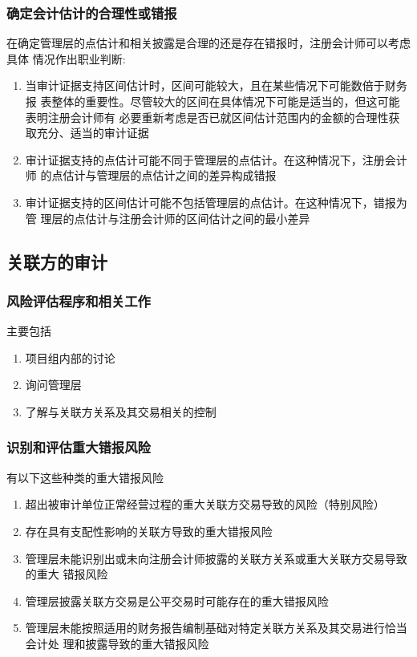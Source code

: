 \documentclass[UTF8,12pt]{ctexart}
\numberwithin{equation}{section} %
\numberwithin{figure}{section}
\numberwithin{table}{section}
\begin{document}
	\subsubsection{确定会计估计的合理性或错报}
	在确定管理层的点估计和相关披露是合理的还是存在错报时，注册会计师可以考虑具体
	情况作出职业判断:
	\begin{enumerate}
		\item 当审计证据支持区间估计时，区间可能较大，且在某些情况下可能数倍于财务报
		表整体的重要性。尽管较大的区间在具体情况下可能是适当的，但这可能表明注册会计师有 必要重新考虑是否已就区间估计范围内的金额的合理性获取充分、适当的审计证据
		
		\item 审计证据支持的点估计可能不同于管理层的点估计。在这种情况下，注册会计师 的点估计与管理层的点估计之间的差异构成错报
		
		\item 审计证据支持的区间估计可能不包括管理层的点估计。在这种情况下，错报为管 理层的点估计与注册会计师的区间估计之间的最小差异
	\end{enumerate}
	
	\subsection{关联方的审计}
	\subsubsection{风险评估程序和相关工作} 主要包括
	\begin{enumerate}
		\item 项目组内部的讨论
		
		\item 询问管理层
		
		\item 了解与关联方关系及其交易相关的控制
	\end{enumerate}
	
	\subsubsection{识别和评估重大错报风险}
	
	有以下这些种类的重大错报风险
	\begin{enumerate}
		\item 超出被审计单位正常经营过程的重大关联方交易导致的风险（特别风险）
		
		\item 存在具有支配性影响的关联方导致的重大错报风险
		
		\item 管理层未能识别出或未向注册会计师披露的关联方关系或重大关联方交易导致的重大 错报风险
		
		\item 管理层披露关联方交易是公平交易时可能存在的重大错报风险
		
		\item 管理层未能按照适用的财务报告编制基础对特定关联方关系及其交易进行恰当会计处 理和披露导致的重大错报风险
	\end{enumerate}
	
\end{document}
